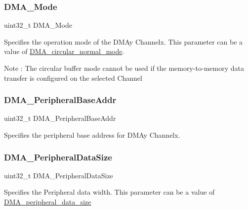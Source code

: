 \subsubsection{\texorpdfstring{DMA\_Mode}{DMA\_Mode}}
{\footnotesize\ttfamily uint32\+\_\+t D\+M\+A\+\_\+\+Mode}

Specifies the operation mode of the D\+M\+Ay Channelx. This parameter can be a value of \mbox{\hyperlink{group___d_m_a__circular__normal__mode}{D\+M\+A\+\_\+circular\+\_\+normal\+\_\+mode}}. \begin{DoxyNote}{Note}
\+: The circular buffer mode cannot be used if the memory-\/to-\/memory data transfer is configured on the selected Channel 
\end{DoxyNote}
\mbox{\label{struct_d_m_a___init_type_def_ad02abd574cca0caeacd0cc05d2174a42}} 
\subsubsection{\texorpdfstring{DMA\_PeripheralBaseAddr}{DMA\_PeripheralBaseAddr}}
{\footnotesize\ttfamily uint32\+\_\+t D\+M\+A\+\_\+\+Peripheral\+Base\+Addr}

Specifies the peripheral base address for D\+M\+Ay Channelx. \mbox{\label{struct_d_m_a___init_type_def_a61bf939d8657d44a9beb1daa91c14668}} 
\subsubsection{\texorpdfstring{DMA\_PeripheralDataSize}{DMA\_PeripheralDataSize}}
{\footnotesize\ttfamily uint32\+\_\+t D\+M\+A\+\_\+\+Peripheral\+Data\+Size}

Specifies the Peripheral data width. This parameter can be a value of \mbox{\hyperlink{group___d_m_a__peripheral__data__size}{D\+M\+A\+\_\+peripheral\+\_\+data\+\_\+size}} \mbox{\label{struct_d_m_a___init_type_def_ad0bf5e8b3968eaf8dc18e923b94acfe1}} 
